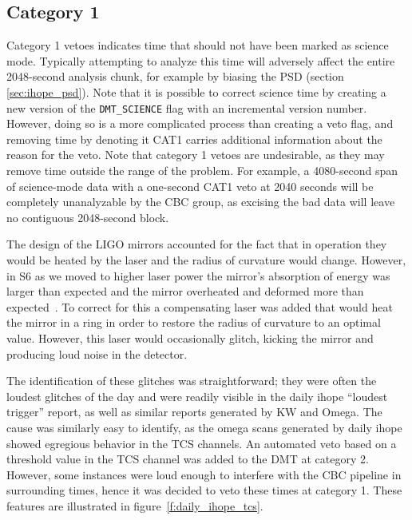 \subsection{Category 1}

Category 1 vetoes indicates time that should not have been marked as
science mode.  Typically attempting to analyze this time will
adversely affect the entire 2048-second analysis chunk, for example by
biasing the PSD (section \ref{sec:ihope_psd}).  Note that it is
possible to correct science time by creating a new version of the
\texttt{DMT\_SCIENCE} flag with an incremental version number.
However, doing so is a more complicated process than creating a veto
flag, and removing time by denoting it CAT1 carries additional
information about the reason for the veto.  Note that category 1
vetoes are undesirable, as they may remove time outside the range of
the problem.  For example, a 4080-second span of science-mode data
with a one-second CAT1 veto at 2040 seconds will be completely
unanalyzable by the CBC group, as excising the bad data will leave no
contiguous 2048-second block.


The design of the LIGO mirrors accounted for the fact that in
operation they would be heated by the laser and the radius of
curvature would change.  However, in S6 as we moved to higher laser
power the mirror's absorption of energy was larger than expected and
the mirror overheated and deformed more than expected~\cite{}.  To
correct for this a compensating laser was added that would heat the
mirror in a ring in order to restore the radius of curvature to an
optimal value.  However, this laser would occasionally glitch, kicking
the mirror and producing loud noise in the detector.

The identification of these glitches was straightforward; they were
often the loudest glitches of the day and were readily visible in the
daily ihope ``loudest trigger'' report, as well as similar reports
generated by KW and Omega.  The cause was similarly easy to identify,
as the omega scans generated by daily ihope showed egregious behavior
in the TCS channels.  An automated veto based on a threshold value in
the TCS channel was added to the DMT at category 2.  However, some
instances were loud enough to interfere with the CBC pipeline in
surrounding times, hence it was decided to veto these times at
category 1.  These features are illustrated in
figure~\ref{f:daily_ihope_tcs}.  


